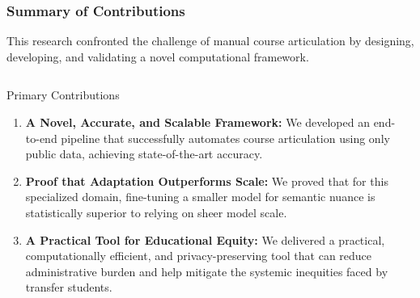 \documentclass[aspectratio=169,10pt]{beamer}
\begin{document}
\begin{frame}
    \frametitle{Summary of Contributions}
    
    This research confronted the challenge of manual course articulation by designing, developing, and validating a novel computational framework.
    
    \begin{columns}[T]
        \begin{column}{0.5\textwidth}
            \begin{alertblock}{Primary Contributions}
                \begin{enumerate}
                    \item \textbf{A Novel, Accurate, and Scalable Framework:} We developed an end-to-end pipeline that successfully automates course articulation using only public data, achieving state-of-the-art accuracy.
                    
                    \item \textbf{Proof that Adaptation Outperforms Scale:} We proved that for this specialized domain, fine-tuning a smaller model for semantic nuance is statistically superior to relying on sheer model scale.
                    
                    \item \textbf{A Practical Tool for Educational Equity:} We delivered a practical, computationally efficient, and privacy-preserving tool that can reduce administrative burden and help mitigate the systemic inequities faced by transfer students.
                \end{enumerate}
            \end{alertblock}
        \end{column}
        
        \begin{column}{0.5\textwidth}
            

\end{column}
\end{columns}
\end{frame}
\end{document}

